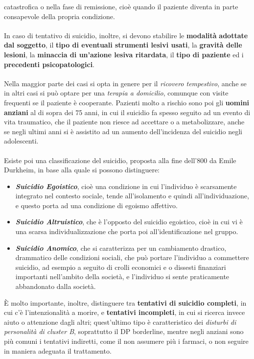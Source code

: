 catastrofica o nella fase di remissione, cioè quando il paziente diventa
in parte consapevole della propria condizione.
\\\\
In caso di tentativo di suicidio, inoltre, si devono stabilire le
\textbf{modalità} \textbf{adottate dal soggetto}, il \textbf{tipo di
eventuali strumenti lesivi usati}, la \textbf{gravità delle lesioni}, la
\textbf{minaccia di un'azione lesiva ritardata}, il \textbf{tipo di
paziente} ed i \textbf{precedenti psicopatologici}.
\\\\
Nella maggior parte dei casi si opta in genere per il \emph{ricovero
tempestivo}, anche se in altri casi si può optare per una \emph{terapia
a domicilio}, comunque con visite frequenti se il paziente è cooperante.
Pazienti molto a rischio sono poi gli \textbf{uomini} \textbf{anziani}
al di sopra dei 75 anni, in cui il suicidio fa spesso seguito ad un
evento di vita traumatico, che il paziente non riesce ad accettare o a
metabolizzare, anche se negli ultimi anni si è assistito ad un aumento
dell'incidenza del suicidio negli adolescenti.
\\\\
Esiste poi una classificazione del suicidio, proposta alla fine dell'800
da Emile Durkheim, in base alla quale si possono distinguere:

\begin{itemize}
\item
  \textbf{\emph{Suicidio Egoistico}}, cioè una condizione in cui
  l'individuo è scarsamente integrato nel contesto sociale, tende
  all'isolamento e quindi all'individuazione, e questo porta ad una
  condizione di egoismo affettivo.
\item
  \textbf{\emph{Suicidio Altruistico}}, che è l'opposto del suicidio
  egoistico, cioè in cui vi è una scarsa individualizzazione che porta
  poi all'identificazione nel gruppo.
\item
  \textbf{\emph{Suicidio Anomico}}, che si caratterizza per un
  cambiamento drastico, drammatico delle condizioni sociali, che può
  portare l'individuo a commettere suicidio, ad esempio a seguito di
  crolli economici e o dissesti finanziari importanti nell'ambito della
  società, e l'individuo si sente praticamente abbandonato dalla
  società.
\end{itemize}

È molto importante, inoltre, distinguere tra \textbf{tentativi di
suicidio completi}, in cui c'è l'intenzionalità a morire, e
\textbf{tentativi incompleti}, in cui si ricerca invece aiuto o
attenzione dagli altri; quest'ultimo tipo è caratteristico dei
\emph{disturbi di personalità di cluster B}, soprattutto il DP
borderline, mentre negli anziani sono più comuni i tentativi indiretti,
come il non assumere più i farmaci, o non seguire in maniera adeguata il
trattamento.
